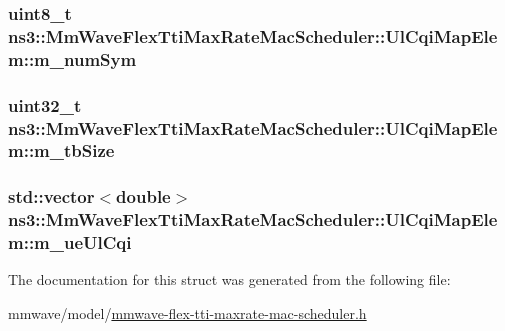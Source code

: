 \subsubsection[{\texorpdfstring{m\+\_\+num\+Sym}{m_numSym}}]{\setlength{\rightskip}{0pt plus 5cm}uint8\+\_\+t ns3\+::\+Mm\+Wave\+Flex\+Tti\+Max\+Rate\+Mac\+Scheduler\+::\+Ul\+Cqi\+Map\+Elem\+::m\+\_\+num\+Sym}\hypertarget{structns3_1_1MmWaveFlexTtiMaxRateMacScheduler_1_1UlCqiMapElem_a08473246ca9b53f05b17041eaef3433b}{}\label{structns3_1_1MmWaveFlexTtiMaxRateMacScheduler_1_1UlCqiMapElem_a08473246ca9b53f05b17041eaef3433b}
\subsubsection[{\texorpdfstring{m\+\_\+tb\+Size}{m_tbSize}}]{\setlength{\rightskip}{0pt plus 5cm}uint32\+\_\+t ns3\+::\+Mm\+Wave\+Flex\+Tti\+Max\+Rate\+Mac\+Scheduler\+::\+Ul\+Cqi\+Map\+Elem\+::m\+\_\+tb\+Size}\hypertarget{structns3_1_1MmWaveFlexTtiMaxRateMacScheduler_1_1UlCqiMapElem_a96cfd4cb52ee5ab17f9fb795495704cd}{}\label{structns3_1_1MmWaveFlexTtiMaxRateMacScheduler_1_1UlCqiMapElem_a96cfd4cb52ee5ab17f9fb795495704cd}
\subsubsection[{\texorpdfstring{m\+\_\+ue\+Ul\+Cqi}{m_ueUlCqi}}]{\setlength{\rightskip}{0pt plus 5cm}std\+::vector$<$double$>$ ns3\+::\+Mm\+Wave\+Flex\+Tti\+Max\+Rate\+Mac\+Scheduler\+::\+Ul\+Cqi\+Map\+Elem\+::m\+\_\+ue\+Ul\+Cqi}\hypertarget{structns3_1_1MmWaveFlexTtiMaxRateMacScheduler_1_1UlCqiMapElem_ad1e0141d05277f9266de6952c69334cb}{}\label{structns3_1_1MmWaveFlexTtiMaxRateMacScheduler_1_1UlCqiMapElem_ad1e0141d05277f9266de6952c69334cb}


The documentation for this struct was generated from the following file\+:\begin{DoxyCompactItemize}
\item 
mmwave/model/\hyperlink{mmwave-flex-tti-maxrate-mac-scheduler_8h}{mmwave-\/flex-\/tti-\/maxrate-\/mac-\/scheduler.\+h}\end{DoxyCompactItemize}
